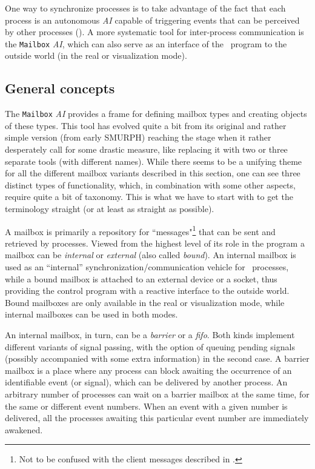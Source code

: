 One way to synchronize processes is to take advantage of the
fact that each process is an autonomous {\em AI} capable of triggering
events that can be perceived by other processes ().
A more systematic tool for inter-process communication is
the {\tt Mailbox} {\em AI}, which can also serve as an interface of the
\smurph\ program to the outside world (in the real or visualization mode).

\subsection{General concepts}
\label{rm_mb_gc}

The {\tt Mailbox} {\em AI\/} provides a frame for defining mailbox types
and creating objects of these types.
This tool has evolved quite a bit from its original and rather simple
version (from early {\sc SMURPH})
reaching the stage when it rather desperately call for some drastic measure,
like replacing it with two or three separate tools (with different names).
While there seems to be a unifying theme for all the different mailbox variants
described in this section, one can see three distinct types of functionality,
which, in combination with some other aspects, require quite a bit of
taxonomy.
This is what we have to start with to get the terminology straight (or at least
as straight as possible).

A mailbox is primarily a repository for
``messages"\footnote{Not to be confused with the client messages described
in .} that can be sent and retrieved by processes.
Viewed from the highest level of its role  in the program a mailbox can be
{\em internal\/} or {\em external\/} (also called {\em bound\/}).
An internal mailbox is used as an ``internal''
synchronization/communication vehicle for 
\smurph\ processes, while a bound mailbox is
attached to an external device or a socket, thus providing the control
program with a reactive interface to the outside world.
Bound mailboxes are only available in the real or visualization
mode, while internal mailboxes can be used in both modes.

An internal mailbox, in turn, can be a {\em barrier\/} or a {\em fifo}.
Both kinds implement different variants of signal passing, with the option
of queuing pending signals (possibly accompanied with some extra information)
in the second case.
A barrier mailbox is a place where any process can block awaiting the
occurrence of an identifiable event (or signal), which can be delivered
by another process.
An arbitrary number of processes can wait on a barrier mailbox at the same
time, for the same or different event numbers.
When an event with a given number is delivered, all the processes awaiting
this particular event number are immediately awakened.


